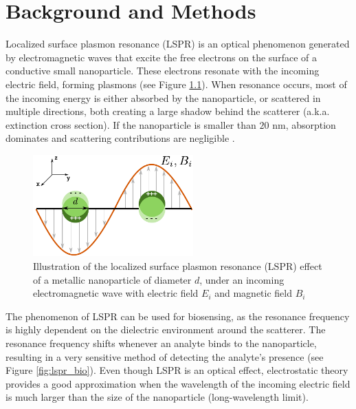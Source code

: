 
\chapter{Background and Methods} \label{chap:methods}
\graphicspath{{background_methods/figs/}}


Localized surface plasmon resonance (LSPR) is an optical phenomenon generated by electromagnetic waves 
that excite the free electrons on the surface of a conductive small nanoparticle. These electrons resonate  
with the incoming electric field, forming plasmons (see Figure \ref{fig:lspr}). When resonance occurs, 
most of the incoming energy is either absorbed by the nanoparticle, or scattered in multiple directions, both
creating a large shadow behind the scatterer (a.k.a. extinction cross section). If the nanoparticle is 
smaller than $20$ nm, absorption dominates and scattering contributions are negligible \cite{PetryayevaKrull2011, OlsonETal2015}.

\begin{figure}
   \centering
     \includegraphics[width=0.55\textwidth]{lspr.pdf} 
     \caption{Illustration of the localized surface plasmon resonance (LSPR) effect of a metallic nanoparticle of diameter $d$, 
     under an incoming electromagnetic wave with electric field $E_i$ and magnetic field $B_i$}
     \label{fig:lspr}
\end{figure}

The phenomenon of LSPR can be used for biosensing, as the resonance frequency is highly dependent on the dielectric environment 
around the scatterer. The resonance frequency shifts whenever an analyte binds to the nanoparticle, 
resulting in a very sensitive method of detecting the analyte's presence \cite{HaesVanduyne2002,HaesETal2004}
(see Figure \ref{fig:lspr_bio}). Even though LSPR is an optical effect, electrostatic theory
provides a good approximation when the wavelength of the incoming electric field is much larger than 
the size of the nanoparticle (long-wavelength limit). 

